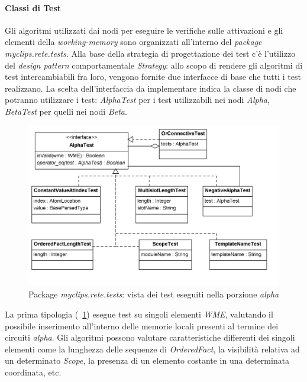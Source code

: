 \paragraph{Classi di Test}

Gli algoritmi utilizzati dai nodi per eseguire le verifiche sulle attivazioni e gli elementi della \emph{working-memory} sono organizzati all'interno del \emph{package} \emph{myclips.rete.tests}. Alla base della strategia di progettazione dei test c'è l'utilizzo del \emph{design pattern} comportamentale \emph{Strategy}: allo scopo di rendere gli algoritmi di test intercambiabili fra loro, vengono fornite due interfacce di base che tutti i test realizzano. La scelta dell'interfaccia da implementare indica la classe di nodi che potranno utilizzare i test: \emph{AlphaTest} per i test utilizzabili nei nodi \emph{Alpha}, \emph{BetaTest} per quelli nei nodi \emph{Beta}.

\begin{figure}
\centering
\includegraphics[width=1\textwidth]{Immagini/Capitolo3/Classi/myclips_rete_tests_Alpha.png}
\caption{Package \emph{myclips.rete.tests}: vista dei test eseguiti nella porzione \emph{alpha}}\label{fig:class-myclips-rete-tests-alpha}
\end{figure}

La prima tipologia (\figurename~\ref{fig:class-myclips-rete-tests-alpha}) esegue test su singoli elementi \emph{WME}, valutando il possibile inserimento all'interno delle memorie locali presenti al termine dei circuiti \emph{alpha}. Gli algoritmi possono valutare caratteristiche differenti dei singoli elementi come la lunghezza delle sequenze di \emph{OrderedFact}, la visibilità relativa ad un determinato \emph{Scope}, la presenza di un elemento costante in una determinata coordinata, etc.

